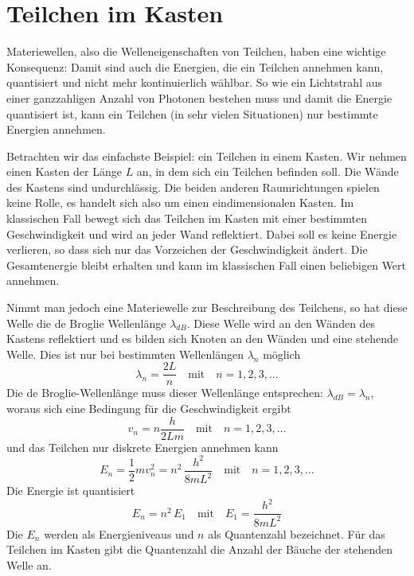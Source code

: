 \section{Teilchen im Kasten}

 Materiewellen, also die Welleneigenschaften von Teilchen, haben eine wichtige Konsequenz: Damit sind auch die Energien, die ein Teilchen annehmen kann, quantisiert und nicht mehr kontinuierlich wählbar. So wie ein Lichtstrahl aus einer ganzzahligen Anzahl von Photonen bestehen muss und damit die Energie quantisiert ist, kann ein Teilchen (in sehr vielen Situationen) nur bestimmte Energien annehmen.

 Betrachten wir das einfachste Beispiel: ein Teilchen in einem Kasten. Wir nehmen einen Kasten der Länge $L$ an, in dem sich ein Teilchen befinden soll. Die Wände des Kastens sind undurchlässig. Die beiden anderen Raumrichtungen spielen keine Rolle, es handelt sich also um einen eindimensionalen Kasten. Im klassischen Fall bewegt sich das Teilchen im Kasten mit einer bestimmten Geschwindigkeit und wird an jeder Wand reflektiert. Dabei soll es keine Energie verlieren, so dass sich nur das Vorzeichen der Geschwindigkeit ändert. Die Gesamtenergie bleibt erhalten und kann im klassischen Fall einen beliebigen Wert annehmen.

Nimmt man jedoch eine Materiewelle zur Beschreibung des Teilchens, so hat diese Welle die de Broglie Wellenlänge $\lambda_{dB}$. Diese Welle wird an den Wänden des Kastens reflektiert und es bilden sich Knoten an den Wänden und eine stehende Welle. Dies ist nur bei bestimmten Wellenlängen $\lambda_n$ möglich
\begin{equation}
    \lambda_n = \frac{2L}{n} \quad \text{mit} \quad n = 1, 2, 3, \dots
\end{equation}
Die de Broglie-Wellenlänge muss dieser Wellenlänge entsprechen: $\lambda_{dB} = \lambda_n$, woraus sich eine Bedingung für die Geschwindigkeit ergibt
\begin{equation}
    v_n = n \frac{h}{2 L m} \quad \text{mit} \quad n = 1, 2, 3, \dots
\end{equation}
und das Teilchen nur diskrete Energien annehmen kann
\begin{equation}
    E_n = \frac{1}{2} m v_n^2 = n^2 \, \frac{h^2}{8 m L^2} \quad \text{mit} \quad n = 1, 2, 3, \dots
\end{equation}
Die Energie ist quantisiert 
\begin{equation}
    E_n = n^2 \, E_1\quad \text{mit} \quad E_1 = \frac{h^2}{8 m L^2} 
\end{equation}
Die $E_n$ werden als Energieniveaus und $n$ als Quantenzahl bezeichnet. Für das Teilchen im Kasten gibt die Quantenzahl die Anzahl der Bäuche der stehenden Welle an.

